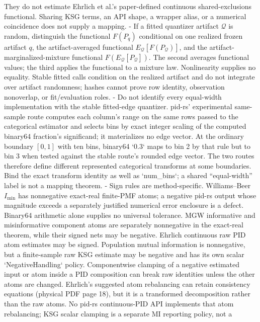 \documentclass[11pt]{article}
\begin{document}
\begin{markdown}
  They do not estimate Ehrlich et al.'s paper-defined continuous shared-exclusions functional.
  Sharing KSG terms, an API shape, a wrapper alias, or a numerical coincidence does not supply a
  mapping.
- If a fitted quantizer artifact $\mathcal Q$ is random, distinguish the functional $F(P_q)$
  conditional on one realized frozen artifact $q$, the artifact-averaged functional
  $E_{\mathcal Q}[F(P_{\mathcal Q})]$, and the artifact-marginalized-mixture functional
  $F(E_{\mathcal Q}[P_{\mathcal Q}])$. The second averages functional values; the third applies the
  functional to a mixture law. Nonlinearity supplies no equality. Stable fitted calls condition on
  the realized artifact and do not integrate over artifact randomness; hashes cannot prove row
  identity, observation nonoverlap, or fit/evaluation roles.
- Do not identify every equal-width implementation with the stable fitted-edge quantizer. pid-rs'
  experimental same-sample route computes each column's range on the same rows passed to the
  categorical estimator and selects bins by exact integer scaling of the computed binary64
  fraction's significand; it materializes no edge vector. At the ordinary boundary $[0,1]$ with ten
  bins, binary64 `0.3` maps to bin 2 by that rule but to bin 3 when tested against the stable route's
  rounded edge vector. The two routes therefore define different represented categorical
  transforms at some boundaries. Bind the exact transform identity as well as `num_bins`; a shared
  “equal-width” label is not a mapping theorem.
- Sign rules are method-specific. Williams--Beer $I_{\min}$ has nonnegative exact-real finite-PMF
  atoms; a negative pid-rs output whose magnitude exceeds a separately justified numerical error
  enclosure is a defect. Binary64 arithmetic alone supplies no universal tolerance. MGW
  informative and misinformative component atoms are separately nonnegative in the
  exact-real theorem, while their signed nets may be negative. Ehrlich continuous raw PID atom
  estimates may be signed. Population mutual information is nonnegative, but a finite-sample raw
  KSG estimate may be negative and has its own scalar `NegativeHandling` policy. Componentwise
  clamping of a negative estimated input or atom inside a PID composition can break raw identities
  unless the other atoms are changed.
  Ehrlich's suggested atom rebalancing can retain consistency equations (physical PDF page 18), but
  it is a transformed decomposition rather than the raw atoms. No pid-rs continuous-PID API
  implements that atom rebalancing; KSG scalar clamping is a separate MI reporting policy, not a

\end{markdown}
\end{document}
